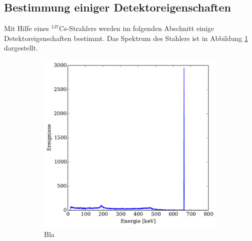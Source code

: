 \subsection{Bestimmung einiger Detektoreigenschaften} %
\label{sub:detektoreigenschaften}
Mit Hilfe eines $^{137}$Cs-Strahlers werden im folgenden Abschnitt einige Detektoreigenschaften bestimmt.
Das Spektrum des Stahlers ist in Abbildung \ref{fig:cs_spektrum} dargestellt.
\begin{figure}[htb]
    \centering
    \begin{subfigure}{0.49\linewidth}
        \centering
        \includegraphics[width=1.0\linewidth]{img/06_caesium.pdf}
        \caption{
            Bla
        }
        \label{fig:cs_spektrum}
    \end{subfigure}
    \begin{subfigure}{0.49\linewidth}
        \centering

\end{subfigure}
\end{figure}
